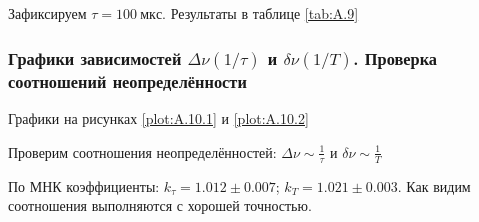 \documentclass[a4paper, 12pt]{article}
\begin{document}
                Зафиксируем $\tau = 100~мкс$. Результаты в таблице \ref{tab:A.9}

            \subsubsection{Графики зависимостей $\Delta \nu(1/\tau)$ и $\delta \nu(1/T)$. Проверка соотношений неопределённости}

                Графики на рисунках \ref{plot:A.10.1} и \ref{plot:A.10.2}

                Проверим соотношения неопределённостей: $\Delta \nu \sim \frac{1}{\tau}$ и $\delta \nu \sim \frac{1}{T}$

                По МНК коэффициенты: $k_{\tau} = 1.012 \pm 0.007$; $k_{T} = 1.021 \pm 0.003$. Как видим соотношения выполняются с хорошей точностью.
\end{document}

